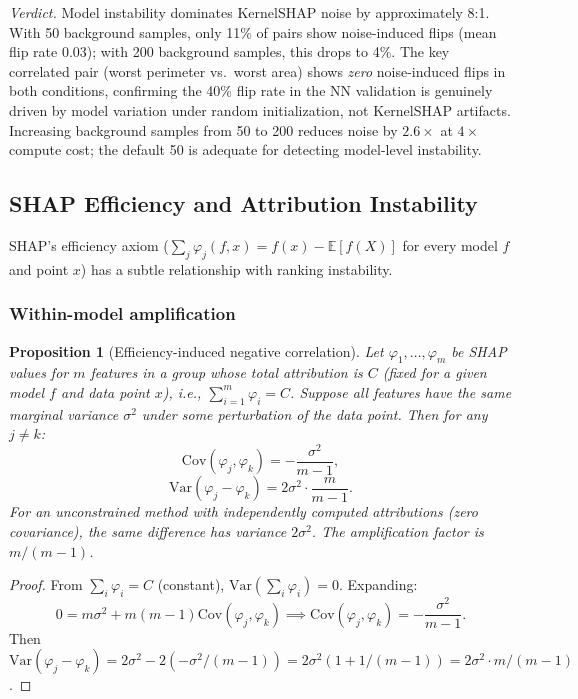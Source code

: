 \documentclass{article}
\newtheorem{proposition}[theorem]{Proposition}
\newcommand{\E}{\mathbb{E}}
\begin{document}
\emph{Verdict.}
Model instability dominates KernelSHAP noise by approximately 8:1.
With 50 background samples, only 11\% of pairs show noise-induced
flips (mean flip rate 0.03); with 200 background samples, this drops
to 4\%. The key correlated pair (worst perimeter vs.\ worst area)
shows \emph{zero} noise-induced flips in both conditions, confirming
the 40\% flip rate in the NN validation is genuinely driven by model
variation under random initialization, not KernelSHAP artifacts.
Increasing background samples from 50 to 200 reduces noise by
$2.6\times$ at $4\times$ compute cost; the default 50 is adequate
for detecting model-level instability.

\subsection{SHAP Efficiency and Attribution Instability}

SHAP's efficiency axiom ($\sum_j \varphi_j(f,x) = f(x) - \E[f(X)]$ for every model $f$ and point $x$) has a subtle relationship with ranking instability.

\subsubsection{Within-model amplification}

\begin{proposition}[Efficiency-induced negative correlation]
\label{prop:efficiency-negcor}
Let $\varphi_1, \ldots, \varphi_m$ be SHAP values for $m$ features in a
group whose total attribution is $C$ (fixed for a given model $f$ and
data point $x$), i.e., $\sum_{i=1}^m \varphi_i = C$.  Suppose all
features have the same marginal variance $\sigma^2$ under some
perturbation of the data point.  Then for any $j \neq k$:
\[
  \mathrm{Cov}(\varphi_j, \varphi_k) = -\frac{\sigma^2}{m-1},
\]
\[
  \mathrm{Var}(\varphi_j - \varphi_k)
  = 2\sigma^2 \cdot \frac{m}{m-1}.
\]
For an unconstrained method with independently computed attributions
(zero covariance), the same difference has variance $2\sigma^2$.
The amplification factor is $m/(m-1)$.
\end{proposition}

\begin{proof}
From $\sum_i \varphi_i = C$ (constant), $\mathrm{Var}(\sum_i \varphi_i) = 0$.
Expanding:
\[
  0 = m\sigma^2 + m(m-1)\mathrm{Cov}(\varphi_j, \varphi_k)
  \implies \mathrm{Cov}(\varphi_j, \varphi_k) = -\frac{\sigma^2}{m-1}.
\]
Then $\mathrm{Var}(\varphi_j - \varphi_k) = 2\sigma^2 - 2(-\sigma^2/(m-1))
= 2\sigma^2(1 + 1/(m-1)) = 2\sigma^2 \cdot m/(m-1)$.
\end{proof}
\end{document}
